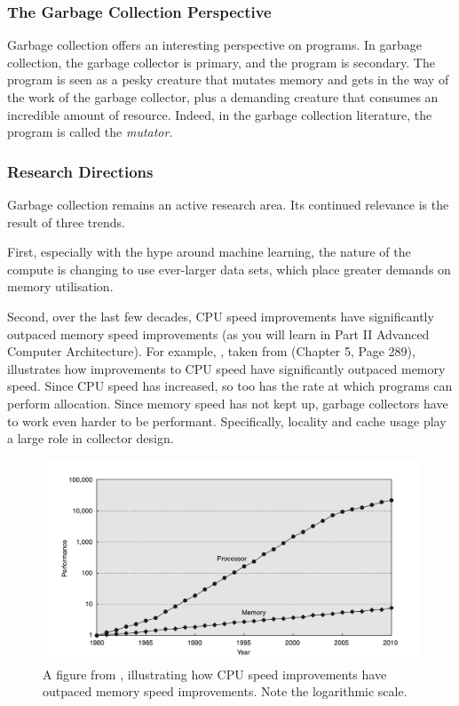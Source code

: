\subsubsection{The Garbage Collection Perspective}
Garbage collection offers an interesting perspective on programs. In garbage collection, the garbage collector is primary, and the program is secondary. The program is seen as a pesky creature that mutates memory and gets in the way of the work of the garbage collector, plus a demanding creature that consumes an incredible amount of resource. Indeed, in the garbage collection literature, the program is called the \textit{mutator}.

\subsubsection{Research Directions}
Garbage collection remains an active research area. Its continued relevance is the result of three trends. 

First, especially with the hype around machine learning, the nature of the compute is changing to use ever-larger data sets, which place greater demands on memory utilisation. 

Second, over the last few decades, CPU speed improvements have significantly outpaced memory speed improvements (as you will learn in \textsf{Part II Advanced Computer Architecture}). For example, , taken from \citet{hennessy-patterson-2017} (Chapter 5, Page 289), illustrates how improvements to CPU speed have significantly outpaced memory speed. Since CPU speed has increased, so too has the rate at which programs can perform allocation. Since memory speed has not kept up, garbage collectors have to work even harder to be performant. Specifically, locality and cache usage play a large role in collector design.

\begin{figure}
    \centering
    \includegraphics[width=0.8\linewidth]{lec12/figures/hennesy-patterson.png}
    \caption{A figure from \citet{hennessy-patterson-2017}, illustrating how CPU speed improvements have outpaced memory speed improvements. Note the logarithmic scale.}
    \label{fig:memory-vs-cpu-speed}
\end{figure}


